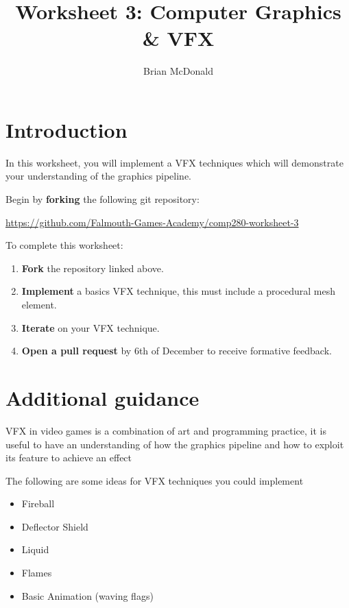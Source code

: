 \documentclass{../../../fal_assignment}
\title{Worksheet 3: Computer Graphics \& VFX}
\author{Brian McDonald}
\begin{document}
\maketitle


\section*{Introduction}

In this worksheet, you will implement a VFX techniques which will demonstrate your understanding of the graphics pipeline.

Begin by \textbf{forking} the following git repository:

\begin{center}
	\url{https://github.com/Falmouth-Games-Academy/comp280-worksheet-3}
\end{center}

To complete this worksheet:

\begin{enumerate}
	\item \textbf{Fork} the repository linked above.
	\item \textbf{Implement} a basics VFX technique, this must include a procedural mesh element.
	\item \textbf{Iterate} on your VFX technique.
	\item \textbf{Open a pull request} by 6th of December to receive formative feedback.
\end{enumerate}

\section*{Additional guidance}

VFX in video games is a combination of art and programming practice, it is useful to have an understanding of how the graphics pipeline and how to exploit its feature to achieve an effect

The following are some ideas for VFX techniques you could implement

\begin{itemize}
	\item Fireball
	\item Deflector Shield 
	\item Liquid
	\item Flames
	\item Basic Animation (waving flags)
\end{itemize}
\end{document}
